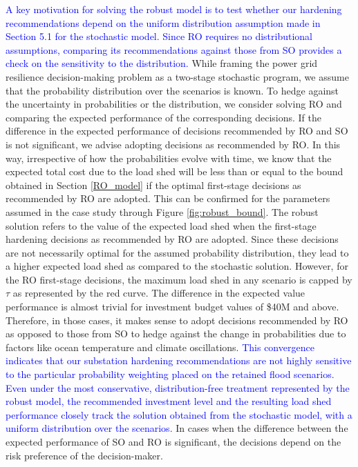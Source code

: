 \documentclass[authoryear,preprint,review,12pt]{elsarticle}\usepackage{amssymb}
\begin{document}
\textcolor{blue}{A key motivation for solving the robust model is to test whether our hardening recommendations depend on the uniform distribution assumption made in Section 5.1 for the stochastic model.
Since RO requires no distributional assumptions, comparing its recommendations against those from SO provides a check on the sensitivity to the distribution.} While framing the power grid resilience decision-making problem as a two-stage stochastic program, we assume that the probability distribution over the scenarios is known.
To hedge against the uncertainty in probabilities or the distribution, we consider solving RO and comparing the expected performance of the corresponding decisions. If the difference in the expected performance of decisions recommended by RO and SO is not significant, we advise adopting decisions as recommended by RO. In this way, irrespective of how the probabilities evolve with time, we know that the expected total cost due to the load shed will be less than or equal to the bound obtained in Section \ref{RO_model} if the optimal first-stage decisions as recommended by RO are adopted. This can be confirmed for the parameters assumed in the case study through Figure \ref{fig:robust_bound}. The robust solution refers to the value of the expected load shed when the first-stage hardening decisions as recommended by RO are adopted. Since these decisions are not necessarily optimal for the assumed probability distribution, they lead to a higher expected load shed as compared to the stochastic solution. However, for the RO first-stage decisions, the maximum load shed in any scenario is capped by $\tau$ as represented by the red curve. The difference in the expected value performance is almost trivial for investment budget values of \$40M and above. Therefore, in those cases, it makes sense to adopt decisions recommended by RO as opposed to those from SO to hedge against the change in probabilities due to factors like ocean temperature and climate oscillations. \textcolor{blue}{This convergence indicates that our substation hardening recommendations are not highly sensitive to the particular probability weighting placed on the retained flood scenarios. Even under the most conservative, distribution-free treatment represented by the robust model, the recommended investment level and the resulting load shed performance closely track the solution obtained from the stochastic model, with a uniform distribution over the scenarios.} In cases when the difference between the expected performance of SO and RO is significant, the decisions depend on the risk preference of the decision-maker.
\end{document}

